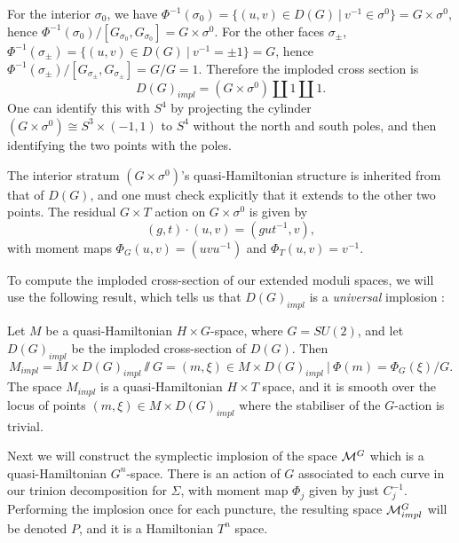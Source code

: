 	For the interior $\sigma_0$, we have $\Phi^{-1}(\sigma_0) = \{(u,v)\in D(G)~|~ v^{-1}\in \sigma^0\} = G \times \sigma^0$, hence $\Phi^{-1}(\sigma_0)/[G_{\sigma_0},G_{\sigma_0}] = G\times \sigma^0$. For the other faces $\sigma_{\pm}$, $\Phi^{-1}(\sigma_\pm) = \{(u,v)\in D(G)~|~ v^{-1} = \pm 1\} = G$, hence $\Phi^{-1}(\sigma_\pm)/[G_{\sigma_\pm},G_{\sigma_\pm}] = G/G = 1$. Therefore the imploded cross section is
	\begin{equation}
			D(G)_{impl} = (G\times \sigma^0) \coprod {1} \coprod {1}.
		\end{equation}
	One can identify this with $S^4$ by projecting the cylinder $(G\times \sigma^0) \cong S^3\times (-1,1)$ to $S^4$ without the north and south poles, and then identifying the two points with the poles. 
		
	The interior stratum $(G\times \sigma^0)$'s quasi-Hamiltonian structure is inherited from that of $D(G)$, and one must check explicitly that it extends to the other two points. The residual $G\times T$ action on $G\times \sigma^0$ is given by
	\begin{equation}
			(g,t)\cdot (u,v) = (gut^{-1},v),
	\end{equation}
	with moment maps $\Phi_G(u,v) = (uvu^{-1})$ and $\Phi_T(u,v) = v^{-1}$.

	To compute the imploded cross-section of our extended moduli spaces, we will use the following result, which tells us that $D(G)_{impl}$ is a \emph{universal} implosion \cite[Prop 2.32]{hurtubise_representations_2000}:
	\begin{theorem}
		Let $M$ be a quasi-Hamiltonian $H\times G$-space, where $G=SU(2)$, and let $D(G)_{impl}$ be the imploded cross-section of $D(G)$. Then
		\begin{equation}
			M_{impl} = M\times D(G)_{impl}\sslash G = {(m,\xi)\in M\times D(G)_{impl}~|~\Phi(m)=\Phi_G(\xi)}/G.
		\end{equation}
		The space $M_{impl}$ is a quasi-Hamiltonian $H\times T$ space, and it is smooth over the locus of points $(m,\xi)\in M\times D(G)_{impl}$ where the stabiliser of the $G$-action is trivial.
	\end{theorem}
	Next we will construct the symplectic implosion of the space $\mathcal{M}^G$ which is a quasi-Hamiltonian $G^n$-space. There is an action of $G$ associated to each curve in our trinion decomposition for $\Sigma$, with moment map $\Phi_j$ given by just $C_j^{-1}$. Performing the implosion once for each puncture, the resulting space $\mathcal{M}^G_{impl}$ will be denoted $P$, and it is a Hamiltonian $T^n$ space.
	
